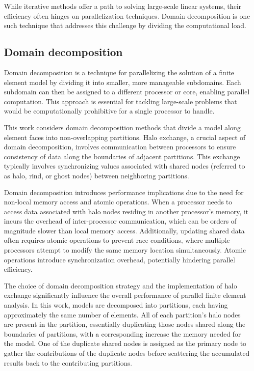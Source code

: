 \documentclass[]             %
{NASA}                       %
\begin{document}
While iterative methods offer a path to solving large-scale linear systems, their efficiency often hinges on parallelization techniques. Domain decomposition is one such technique that addresses this challenge by dividing the computational load.

\subsection{Domain decomposition}

Domain decomposition is a technique for parallelizing the solution of a finite element model by dividing it into smaller, more manageable subdomains. Each subdomain can then be assigned to a different processor or core, enabling parallel computation. This approach is essential for tackling large-scale problems that would be computationally prohibitive for a single processor to handle.

This work considers domain decomposition methods that divide a model along element faces into non-overlapping partitions. 
Halo  exchange, a crucial aspect of domain decomposition, involves communication between processors to ensure consistency of data along the boundaries of adjacent partitions. This exchange typically involves synchronizing values associated with shared nodes (referred to as halo, rind, or ghost nodes) between neighboring partitions.

Domain decomposition introduces performance implications due to the need for non-local memory access and atomic operations. When a processor needs to access data associated with halo nodes residing in another processor's memory, it incurs the overhead of inter-processor communication, which can be orders of magnitude slower than local memory access. Additionally, updating shared data often requires atomic operations to prevent race conditions, where multiple processors attempt to modify the same memory location simultaneously. Atomic operations introduce synchronization overhead, potentially hindering parallel efficiency.

The choice of domain decomposition strategy and the implementation of halo exchange significantly influence the overall performance of parallel finite element analysis. 
In this work, models are decomposed into partitions, each having approximately the same number of elements. All of each partition's halo nodes are present in the partition, essentially duplicating those nodes shared along the boundaries of partitions, with a corresponding increase the memory needed for the model. One of the duplicate shared nodes is assigned as the primary node to gather the contributions of the duplicate nodes before scattering the accumulated results back to the contributing partitions.
\end{document}
